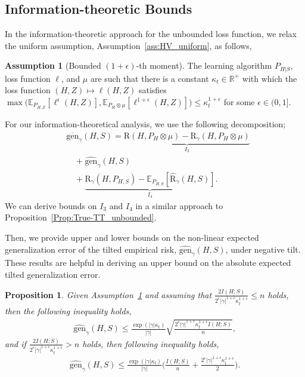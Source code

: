 \documentclass{article}
\theoremstyle{plain}
\theoremstyle{plain}
\newtheorem{proposition}[theorem]{Proposition}
\theoremstyle{definition}
\newtheorem{assumption}[theorem]{Assumption}
\theoremstyle{remark}
\newcommand{\RTERM}{\widehat{\mathrm{R}}_{\gamma}}
\newcommand{\RTrue}{\mathrm{R}}
\newcommand{\RTET}{\mathrm{R}_{\gamma}}
\newcommand{\mbE}{\mathbb{E}}
\begin{document}
\subsection{Information-theoretic Bounds}
 In the information-theoretic approach for the unbounded loss function, we relax the uniform assumption, Assumption~\ref{ass:HV_uniform}, as follows,
\begin{assumption}[Bounded $(1+\epsilon)$-th moment]\label{ass: bounded sec moment}
    The learning algorithm $P_{H|S}$, loss function $\ell$, and $\mu$ are such that there is a constant $\kappa_t\in\mathbb{R}^+$ with which the loss function $(H,Z)\mapsto\ell(H,Z)$ satisfies $\max\big(\mbE_{P_{H,Z}}[\ell^{\epsilon}(H,Z)],\mbE_{P_{H}\otimes \mu}[\ell^{1+\epsilon}(H,Z)]\big)\leq \kappa_t^{1+\epsilon}$ for some $\epsilon\in(0,1]$.
\end{assumption}
For our information-theoretical analysis, we use the following decomposition; 
\begin{equation}\label{eq: s decomp exp unbound}
        \begin{split}
        &\overline{\mathrm{gen}}_{\gamma}(H,S)= \underbrace{\RTrue(H, P_{H}\otimes \mu)- \RTET(H,P_{H}\otimes \mu)}_{I_3}\\&\quad+  \widehat{\mathrm{gen}}_{\gamma}(H,S)\\
            &\quad+ \underbrace{\RTET(H,P_{H,S}) -\mbE_{P_{H,S}}[\RTERM(H,S)]}_{I_4}.
        \end{split}
\end{equation}
We can derive bounds on $I_3$ and $I_4$ in a similar approach to Proposition~\ref{Prop:True-TT_unbounded}.

Then, we provide upper and lower bounds on the non-linear expected generalization error of the tilted empirical risk, $\widehat{\mathrm{gen}}_{\gamma}(H,S)$, under negative tilt. These results are helpful in deriving an upper bound on the absolute expected tilted generalization error. 
\begin{proposition}\label{prop: upper via Mutual V2 unbound}
Given Assumption~\ref{ass: bounded sec moment} and assuming that $\frac{2I(H;S)}{2^{\epsilon}|\gamma|^{1+\epsilon} \kappa_t^{1+\epsilon}}\leq n $ holds, then the following inequality holds,
\begin{equation*}
    \begin{split}
          \widehat{\mathrm{gen}}_{\gamma}(H,S)\leq  
            \frac{\exp(|\gamma| \kappa_t)}{|\gamma|} \sqrt{\frac{2^{\epsilon}|\gamma|^{1+\epsilon} \kappa_t^{1+\epsilon} I(H;S)}{n}},
    \end{split}
\end{equation*}
and if $\frac{2I(H;S)}{2^{\epsilon}|\gamma|^{1+\epsilon} \kappa_t^{1+\epsilon}}>n$ holds, then following inequality holds, 
\begin{equation*}
    \begin{split}
       \widehat{\mathrm{gen}}_{\gamma}(H,S)\leq  \frac{\exp(|\gamma| \kappa_t)}{ |\gamma|}\Big( \frac{ I(H;S)}{n}+\frac{2^{\epsilon}|\gamma|^{1+\epsilon} \kappa_t^{1+\epsilon}}{2}\Big).
    \end{split}
\end{equation*}
\end{proposition}
\end{document}
